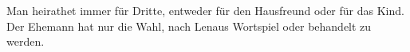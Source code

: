 Man heirathet immer für Dritte, entweder für den Hausfreund oder für das Kind. Der Ehemann hat nur die Wahl, nach Lenaus Wortspiel  oder behandelt zu werden.
\par

